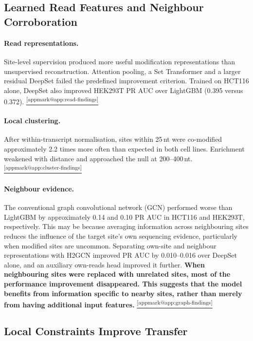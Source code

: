 \documentclass[11pt,a4paper]{article}
\makeatletter
\DeclareRobustCommand{\applink}[1]{%
    \hyperref[#1]{\textsuperscript{\ref*{appmark@#1}}}}
\makeatother
\begin{document}
\subsection{Learned Read Features and Neighbour Corroboration}
\label{sec:dev}
\paragraph{Read representations.}\label{sec:reads}
Site-level supervision produced more useful modification representations
than unsupervised reconstruction. Attention pooling, a Set Transformer
and a larger residual DeepSet failed the predefined improvement criterion.
Trained on HCT116 alone, DeepSet also improved HEK293T PR AUC over
LightGBM (0.395 versus 0.372).
\applink{app:read-findings}

\paragraph{Local clustering.}\label{sec:cluster}
After within-transcript normalisation, sites within 25\,nt
were co-modified approximately 2.2 times more often than
expected in both cell lines. Enrichment weakened with
distance and approached the null at 200--400\,nt.
\applink{app:cluster-findings}

\paragraph{Neighbour evidence.}\label{sec:graph}
The conventional graph convolutional network (GCN) performed worse than LightGBM by approximately 0.14 and 0.10 PR AUC in HCT116 and HEK293T, respectively. This may be because averaging information across neighbouring sites reduces the influence of the target site's own sequencing evidence, particularly when modified sites are uncommon. Separating own-site and
neighbour representations with H2GCN improved PR AUC by 0.010--0.016 over
DeepSet alone, and an auxiliary own-reads head improved it further.
\textbf{When neighbouring sites were replaced with unrelated sites, most of the performance improvement disappeared. This suggests that the model benefits from information specific to nearby sites, rather than merely from having additional input features.}\applink{app:graph-findings}

\subsection{Local Constraints Improve Transfer}
\end{document}
